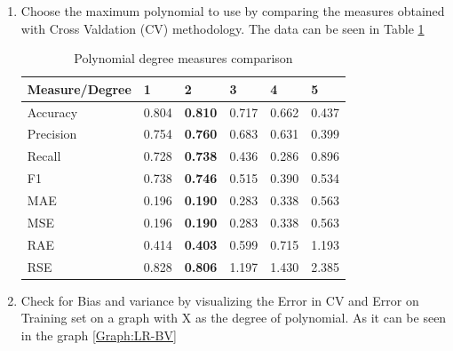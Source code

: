\documentclass{article}
\begin{document}
\begin{enumerate}  
\item Choose the maximum polynomial to use by comparing the measures obtained with Cross Valdation (CV) methodology. The data can be seen in Table
\ref{tab:LR-Measures} 

\begin{table}[]
\centering
\caption{Polynomial degree measures comparison}
\label{tab:LR-Measures}
\begin{tabular}{|l|l|l|l|l|l|}
\hline
Measure/Degree  & 1     & \textbf{2}     & 3     & 4     & 5     \\ \hline
Accuracy  		& 0.804 & \textbf{0.810} & 0.717 & 0.662 & 0.437 \\ \hline
Precision		& 0.754 & \textbf{0.760} & 0.683 & 0.631 & 0.399 \\ \hline
Recall    		& 0.728 & \textbf{0.738} & 0.436 & 0.286 & 0.896 \\ \hline
F1        		& 0.738 & \textbf{0.746} & 0.515 & 0.390 & 0.534 \\ \hline
MAE       		& 0.196 & \textbf{0.190} & 0.283 & 0.338 & 0.563 \\ \hline
MSE       		& 0.196 & \textbf{0.190} & 0.283 & 0.338 & 0.563 \\ \hline
RAE       		& 0.414 & \textbf{0.403} & 0.599 & 0.715 & 1.193 \\ \hline
RSE       		& 0.828 & \textbf{0.806} & 1.197 & 1.430 & 2.385 \\ \hline
\end{tabular}
\end{table}

\item Check for Bias and variance by visualizing the Error in CV and Error on Training set on a graph with X as the degree of polynomial. As it can be seen in the graph \ref{Graph:LR-BV}


\end{enumerate}
\end{document}
